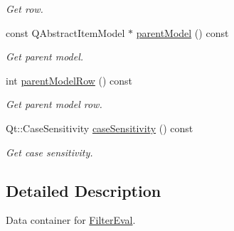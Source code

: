 \begin{DoxyCompactItemize}
\begin{DoxyCompactList}\small\item\em Get row. \end{DoxyCompactList}\item 
const Q\+Abstract\+Item\+Model $\ast$ \hyperlink{class_mdt_1_1_item_model_1_1_expression_1_1_filter_eval_data_aa334fe0d5f5e661dd4264a2999bb2cf1}{parent\+Model} () const \hypertarget{class_mdt_1_1_item_model_1_1_expression_1_1_filter_eval_data_aa334fe0d5f5e661dd4264a2999bb2cf1}{}\label{class_mdt_1_1_item_model_1_1_expression_1_1_filter_eval_data_aa334fe0d5f5e661dd4264a2999bb2cf1}

\begin{DoxyCompactList}\small\item\em Get parent model. \end{DoxyCompactList}\item 
int \hyperlink{class_mdt_1_1_item_model_1_1_expression_1_1_filter_eval_data_a31774b03d25aaae5586dc8fa379a150c}{parent\+Model\+Row} () const \hypertarget{class_mdt_1_1_item_model_1_1_expression_1_1_filter_eval_data_a31774b03d25aaae5586dc8fa379a150c}{}\label{class_mdt_1_1_item_model_1_1_expression_1_1_filter_eval_data_a31774b03d25aaae5586dc8fa379a150c}

\begin{DoxyCompactList}\small\item\em Get parent model row. \end{DoxyCompactList}\item 
Qt\+::\+Case\+Sensitivity \hyperlink{class_mdt_1_1_item_model_1_1_expression_1_1_filter_eval_data_a08bd3265784aa9830dbead10258400f1}{case\+Sensitivity} () const \hypertarget{class_mdt_1_1_item_model_1_1_expression_1_1_filter_eval_data_a08bd3265784aa9830dbead10258400f1}{}\label{class_mdt_1_1_item_model_1_1_expression_1_1_filter_eval_data_a08bd3265784aa9830dbead10258400f1}

\begin{DoxyCompactList}\small\item\em Get case sensitivity. \end{DoxyCompactList}\end{DoxyCompactItemize}


\subsection{Detailed Description}
Data container for \hyperlink{struct_mdt_1_1_item_model_1_1_expression_1_1_filter_eval}{Filter\+Eval}. 

